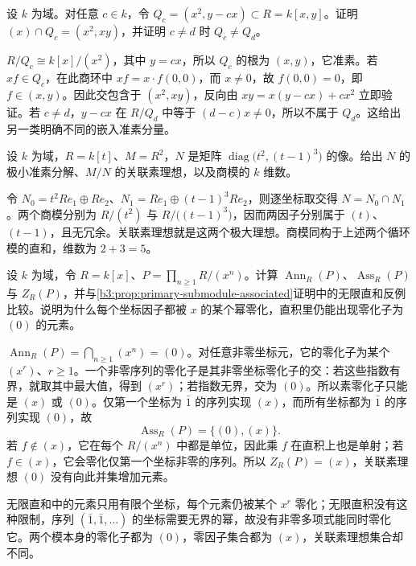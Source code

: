 \begin{exercise}\label{b3:ex:04-parameter-embedded-components}
	设 \(k\) 为域。对任意 \(c\in k\)，令 \(Q_c=(x^2,y-cx)\subset R=k[x,y]\)。证明 \((x)\cap Q_c=(x^2,xy)\)，并证明 \(c\ne d\) 时 \(Q_c\ne Q_d\)。
\end{exercise}
\begin{solution}
	\(R/Q_c\cong k[x]/(x^2)\)，其中 \(y=cx\)，所以 \(Q_c\) 的根为 \((x,y)\)，它准素。若 \(xf\in Q_c\)，在此商环中 \(xf=x\cdot f(0,0)\)，而 \(x\ne0\)，故 \(f(0,0)=0\)，即 \(f\in(x,y)\)。因此交包含于 \((x^2,xy)\)，反向由 \(xy=x(y-cx)+cx^2\) 立即验证。若 \(c\ne d\)，\(y-cx\) 在 \(R/Q_d\) 中等于 \((d-c)x\ne0\)，所以不属于 \(Q_d\)。这给出另一类明确不同的嵌入准素分量。
\end{solution}

\begin{exercise}\label{b3:ex:04-diagonal-presentation}
	设 \(k\) 为域，\(R=k[t]\)、\(M=R^2\)，\(N\) 是矩阵 \(\operatorname{diag}\bigl(t^2,(t-1)^3\bigr)\) 的像。给出 \(N\) 的极小准素分解、\(M/N\) 的关联素理想，以及商模的 \(k\) 维数。
\end{exercise}
\begin{solution}
	令 \(N_0=t^2Re_1\oplus Re_2\)、\(N_1=Re_1\oplus(t-1)^3Re_2\)，则逐坐标取交得 \(N=N_0\cap N_1\)。两个商模分别为 \(R/(t^2)\) 与 \(R/\bigl((t-1)^3\bigr)\)，因而两因子分别属于 \((t)\)、\((t-1)\)，且无冗余。关联素理想就是这两个极大理想。商模同构于上述两个循环模的直和，维数为 \(2+3=5\)。
\end{solution}

\begin{exercise}\label{b3:ex:04-finiteness-primary-module}
	设 \(k\) 为域，令 \(R=k[x]\)、\(P=\prod_{n\ge1}R/(x^n)\)。计算 \(\operatorname{Ann}_R(P)\)、\(\operatorname{Ass}_R(P)\) 与 \(Z_R(P)\)，并与\cref{b3:prop:primary-submodule-associated}证明中的无限直和反例比较。说明为什么每个坐标因子都被 \(x\) 的某个幂零化，直积里仍能出现零化子为 \((0)\) 的元素。
\end{exercise}
\begin{solution}
	\(\operatorname{Ann}_R(P)=\bigcap_{n\ge1}(x^n)=(0)\)。对任意非零坐标元，它的零化子为某个 \((x^r)\)、\(r\ge1\)。一个非零序列的零化子是其非零坐标零化子的交：若这些指数有界，就取其中最大值，得到 \((x^r)\)；若指数无界，交为 \((0)\)。所以素零化子只能是 \((x)\) 或 \((0)\)。仅第一个坐标为 \(\bar1\) 的序列实现 \((x)\)，而所有坐标都为 \(\bar1\) 的序列实现 \((0)\)，故
	\[
		\operatorname{Ass}_R(P)=\{(0),(x)\}.
	\]
	若 \(f\notin(x)\)，它在每个 \(R/(x^n)\) 中都是单位，因此乘 \(f\) 在直积上也是单射；若 \(f\in(x)\)，它会零化仅第一个坐标非零的序列。所以 \(Z_R(P)=(x)\)，关联素理想 \((0)\) 没有向此并集增加元素。

	无限直和中的元素只用有限个坐标，每个元素仍被某个 \(x^r\) 零化；无限直积没有这种限制，序列 \((\bar1,\bar1,\ldots)\) 的坐标需要无界的幂，故没有非零多项式能同时零化它。两个模本身的零化子都为 \((0)\)，零因子集合都为 \((x)\)，关联素理想集合却不同。
\end{solution}

